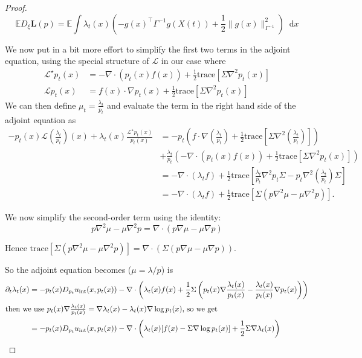 \documentclass[10pt]{article}
\numberwithin{equation}{section}
\numberwithin{figure}{section}
\theoremstyle{remark}
\newcommand{\tr}{\mathrm{trace}}
\newcommand{\cL}{\mathcal L}
\newcommand{\dd }{\mathop{}\!\mathrm{d}}
\newcommand{\E}{\mathbb E}
\begin{document}
\begin{proof}
\[\mathbb{E}D_\xi \mathbf L(p) = \E \int   \lambda_t(x)  \left( - g(x)^\top \Gamma^{-1} g(X(t))    +\frac{1}{2} \| g(x)\|^2_{\Gamma^{-1}} \right) \dd x\]


 We now put in a bit more effort to simplify the first two terms in the adjoint equation, using the special structure of $\cL$ in our case where 
\begin{align*}
    \cL^\star p_t(x) &= -\nabla \cdot (p_t(x) f(x)) + \frac{1}{2} \tr[\Sigma \nabla^2 p_t(x)] \\
    \cL p_t(x)  & = f(x) \cdot \nabla p_t(x) + \frac{1}{2}\tr[\Sigma \nabla^2 p_t(x)]
\end{align*}
We can then define $\mu_t = \frac{\lambda_t}{p_t}$ and evaluate the term in the right hand side of the adjoint equation as
\begin{align*}
    - p_t(x)\cL \left(\frac{\lambda_t}{p_t} \right)(x) + \lambda_t(x)\frac{\cL^\star p_t(x)}{p_t(x)} &= -p_t \left(  f \cdot \nabla \left(\frac{\lambda_t}{p_t} \right) + \frac{1}{2}\tr\left[\Sigma \nabla^2 \left( \frac{\lambda_t}{p_t} \right) \right] \right) \\
    &+  \frac{\lambda_t}{p_t} \left( -\nabla \cdot (p_t(x) f(x)) + \frac{1}{2} \tr[\Sigma \nabla^2 p_t(x)] \right)  \\
    & = -\nabla \cdot \left( \lambda_t f \right) + \frac{1}{2} \tr \left[ \frac{\lambda_t}{p_t} \nabla^2 p_t \Sigma - p_t \nabla^2 \left( \frac{\lambda_t}{p_t} \right) \Sigma  \right] \\
    &= -\nabla \cdot \left( \lambda_t f \right)  + \frac{1}{2} \tr\left[ \Sigma \left( p \nabla^2 \mu - \mu \nabla^2 p \right) \right].
\end{align*}


We now simplify the second-order term using the identity:
\[
p \nabla^2 \mu - \mu \nabla^2 p = \nabla \cdot (p \nabla \mu - \mu \nabla p)
\]

Hence $\tr\left[ \Sigma (p \nabla^2 \mu - \mu \nabla^2 p) \right]
= \nabla \cdot \left( \Sigma (p \nabla \mu - \mu \nabla p) \right) $. 

So the adjoint equation becomes ($\mu = \lambda /p$) is 
\begin{align*}
     \partial_t \lambda_t(x) &= -p_t(x) D_{p_t}u_\mathrm{int}(x,p_t(x)) -\nabla \cdot \left(\lambda_t(x) f(x) + \frac{1}{2} \Sigma \left(p_t(x) \nabla \frac{\lambda_t(x)}{p_t(x)} - \frac{\lambda_t(x)}{p_t(x)} \nabla p_t(x)\right) \right)\\
     \intertext{then we use $p_t(x) \nabla \frac{\lambda_t(x)}{p_t(x)} = \nabla \lambda_t(x) - \lambda_t(x) \nabla \log p_t(x)$, so we get}
     &= -p_t(x) D_{p_t}u_\mathrm{int}(x,p_t(x)) -\nabla \cdot \left(\lambda_t(x) [f(x) -\Sigma \nabla \log p_t(x)] + \frac{1}{2} \Sigma \nabla \lambda_t(x) \right)
\end{align*}
\end{proof}
\end{document}
